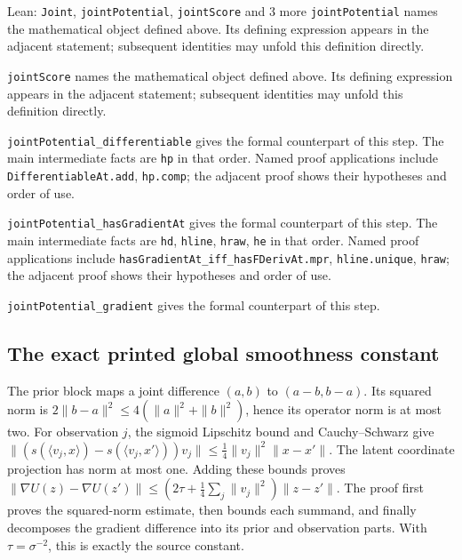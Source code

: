 \documentclass[11pt,a4paper]{report}
\begin{document}
\begin{leanbox}{Lean: \texttt{Joint}, \texttt{jointPotential}, \texttt{jointScore} and 3 more}
\texttt{joint\allowbreak{}Potential} names the mathematical object defined above. Its defining expression appears in the adjacent statement; subsequent identities may unfold this definition directly.




\texttt{joint\allowbreak{}Score} names the mathematical object defined above. Its defining expression appears in the adjacent statement; subsequent identities may unfold this definition directly.




\texttt{joint\allowbreak{}Potential\_\allowbreak{}differentiable} gives the formal counterpart of this step. The main intermediate facts are \texttt{hp} in that order. Named proof applications include \texttt{Differentiable\allowbreak{}At.\allowbreak{}add}, \texttt{hp.\allowbreak{}comp}; the adjacent proof shows their hypotheses and order of use.




\texttt{joint\allowbreak{}Potential\_\allowbreak{}has\allowbreak{}Gradient\allowbreak{}At} gives the formal counterpart of this step. The main intermediate facts are \texttt{hd}, \texttt{hline}, \texttt{hraw}, \texttt{he} in that order. Named proof applications include \texttt{has\allowbreak{}Gradient\allowbreak{}At\_\allowbreak{}iff\_\allowbreak{}has\allowbreak{}FDeriv\allowbreak{}At.\allowbreak{}mpr}, \texttt{hline.\allowbreak{}unique}, \texttt{hraw}; the adjacent proof shows their hypotheses and order of use.




\texttt{joint\allowbreak{}Potential\_\allowbreak{}gradient} gives the formal counterpart of this step.
\end{leanbox}
\subsection{\texorpdfstring{The exact printed global smoothness constant}{The exact printed global smoothness constant}}
\label{report-step-KIPLMC-LogisticExample-lean-6}


The prior block maps a joint difference \((a,b)\) to \((a-b,b-a)\). Its squared norm is \(2\|b-a\|^2\le4(\|a\|^2+\|b\|^2)\), hence its operator norm is at most two. For observation \(j\), the sigmoid Lipschitz bound and Cauchy–Schwarz give \(\|(s(\langle v_j,x\rangle)-s(\langle v_j,x'\rangle))v_j\|\le\frac14\|v_j\|^2\|x-x'\|\). The latent coordinate projection has norm at most one. Adding these bounds proves \(\|\nabla U(z)-\nabla U(z')\|\le(2\tau+\frac14\sum_j\|v_j\|^2)\|z-z'\|\). The proof first proves the squared-norm estimate, then bounds each summand, and finally decomposes the gradient difference into its prior and observation parts. With \(\tau=\sigma^{-2}\), this is exactly the source constant.
\end{document}
